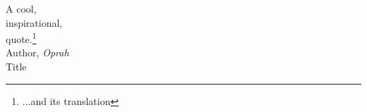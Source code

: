 \thispagestyle{empty}
\begin{flushright}

\vspace*{60mm}

A cool,\\
inspirational,\\
quote.\footnote{...and its translation}\\

\vspace{4mm}
Author, \textit{Oprah}\\
Title




\end{flushright}
